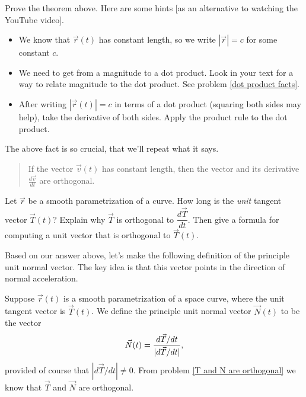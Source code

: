 \begin{problem}%
 Prove the theorem above. Here are some hints [as an alternative to watching the YouTube video].
\begin{itemize}
 \item We know that $\vec r(t)$ has constant length, so we write $|\vec r|=c$ for some constant $c$. 
 \item We need to get from a magnitude to a dot product. Look in your text for a way to relate magnitude to the dot product. See problem \ref{dot product facts}.
 \item After writing $|\vec r(t)|=c$ in terms of a dot product (squaring both sides may help), take the derivative of both sides. Apply the product rule to the dot product.
\end{itemize}
\end{problem}

The above fact is so crucial, that we'll repeat what it says.
\begin{quote}
If the vector $\vec v(t)$ has constant length, then the vector and its derivative $\frac{d\vec v}{dt}$ are orthogonal.
\end{quote}


\begin{problem}\label{T and N are orthogonal}%
 Let $\vec r$ be a smooth parametrization of a curve.  How long is the {\it unit} tangent vector $\vec T(t)$? Explain why $\vec T$ is orthogonal to $\dfrac{d\vec T}{dt}$.
 Then give a formula for computing a unit vector that is orthogonal to $\vec T(t)$. 
\end{problem}


Based on our answer above, let's make the following definition of the principle unit normal vector.  The key idea is that this vector points in the direction of normal acceleration. 
\begin{definition}
 Suppose $\vec r(t)$ is a smooth parametrization of a space curve, where the unit tangent vector is $\vec T(t)$.  
We define the principle unit normal vector $\vec N(t)$ to be the vector
 $$\vec N(t) = \displaystyle\frac{d\vec T/dt}{|d\vec T/dt|},$$
 provided of course that $|d\vec T/dt|\neq 0$. 
 From problem \ref{T and N are orthogonal} we know that $\vec T$ and $\vec N$ are orthogonal.
\end{definition}

